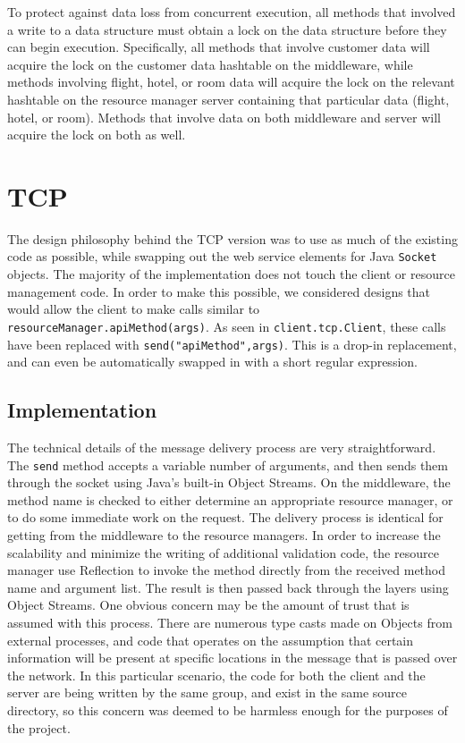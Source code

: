 \documentclass[11pt]{article}
\begin{document}
To protect against data loss from concurrent execution, all methods that involved a write to a data structure must obtain a lock on the data structure before they can begin execution. Specifically, all methods that involve customer data will acquire the lock on the customer data hashtable on the middleware, while methods involving flight, hotel, or room data will acquire the lock on the relevant hashtable on the resource manager server containing that particular data (flight, hotel, or room). Methods that involve data on both middleware and server will acquire the lock on both as well. \par

\section*{TCP}

The design philosophy behind the TCP version was to use as much of the existing code as possible, while swapping out the web service elements for Java \texttt{Socket} objects. The majority of the implementation does not touch the client or resource management code. In order to make this possible, we considered designs that would allow the client to make calls similar to \texttt{resourceManager.apiMethod(args)}. As seen in \texttt{client.tcp.Client}, these calls have been replaced with \texttt{send("apiMethod",args)}. This is a drop-in replacement, and can even be automatically swapped in with a short regular expression. \par 

\subsection*{Implementation} 

The technical details of the message delivery process are very straightforward. The \texttt{send} method accepts a variable number of arguments, and then sends them through the socket using Java's built-in Object Streams. On the middleware, the method name is checked to either determine an appropriate resource manager, or to do some immediate work on the request. The delivery process is identical for getting from the middleware to the resource managers. In order to increase the scalability and minimize the writing of additional validation code, the resource manager use Reflection to invoke the method directly from the received method name and argument list. The result is then passed back through the layers using Object Streams. One obvious concern may be the amount of trust that is assumed with this process. There are numerous type casts made on Objects from external processes, and code that operates on the assumption that certain information will be present at specific locations in the message that is passed over the network. In this particular scenario, the code for both the client and the server are being written by the same group, and exist in the same source directory, so this concern was deemed to be harmless enough for the purposes of the project. \par
\end{document}
